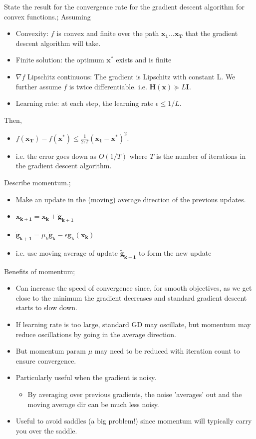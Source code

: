 \documentclass{article}
\begin{document}
State the result for the convergence rate for the gradient descent algorithm for convex functions.; Assuming \begin{itemize} \item Convexity: $f$ is convex and finite over the path $\mathbf{x_1...x_T}$ that the gradient descent algorithm will take.  \item Finite solution: the optimum $\mathbf{x^*}$ exists and is finite \item $\nabla f$ Lipschitz continuous: The gradient is Lipschitz with constant L. We further assume $f$ is twice differentiable. i.e. $\mathbf{H(x)}\succeq L\mathbf{I}$.  \item Learning rate: at each step, the learning rate $\epsilon \leq 1/L$.  \end{itemize} Then, \begin{itemize} \item $f(\mathbf{x_T})-f (\mathbf{x^*})\leq \frac{1}{2\epsilon T}(\mathbf{x_1-x^*})^2$.  \item i.e. the error goes down as $O(1/T)$ where $T$ is the number of iterations in the gradient descent algorithm.  \end{itemize}

Describe momentum.;\begin{itemize} \item Make an update in the (moving) average direction of the previous updates.  \item $\mathbf{x_{k+1}=x_k+\tilde{g}_{k+1}}$ \item $\mathbf{\tilde{g}_{k+1}}=\mu_k\mathbf{\tilde{g}_k}-\epsilon \mathbf{g_k(x_k)}$ \item i.e. use moving average of update $\mathbf{\tilde{g}_{k+1}}$ to form the new update \end{itemize}

Benefits of momentum; \begin{itemize} \item Can increase the speed of convergence since, for smooth objectives, as we get close to the minimum the gradient decreases and standard gradient descent starts to slow down.  \item If learning rate is too large, standard GD may oscillate, but momentum may reduce oscillations by going in the average direction.  \item But momentum param $\mu$ may need to be reduced with iteration count to ensure convergence.  \item Particularly useful when the gradient is noisy.  \begin{itemize} \item By averaging over previous gradients, the noise 'averages' out and the moving average dir can be much less noisy.  \end{itemize} \item Useful to avoid saddles (a big problem!) since momentum will typically carry you over the saddle.  \end{itemize}
\end{document}
